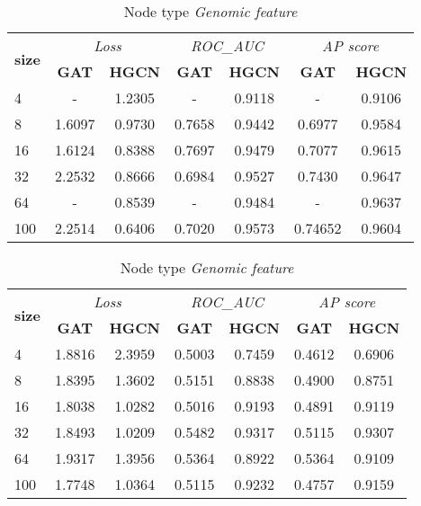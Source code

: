 \begin{table}
    \centering
    \begin{subtable}[t]{\textwidth}
        \centering
        \begin{tabular}{l|cc|cc|cc}        
            \toprule
            \multirow{2}{*}{\textbf{size}} & \multicolumn{2}{c}{\textit{Loss}} & \multicolumn{2}{c}{\textit{ROC\_AUC}} & \multicolumn{2}{c}{\textit{AP score}} \\
            & \textbf{GAT} & \textbf{HGCN} & \textbf{GAT} & \textbf{HGCN} & \textbf{GAT} & \textbf{HGCN} \\
            \midrule
            4 & - & 1.2305 & - & 0.9118 & - & 0.9106 \\
            8 & 1.6097 & 0.9730 & 0.7658 & 0.9442 & 0.6977 & 0.9584 \\
            16 & 1.6124 & 0.8388 & 0.7697 & 0.9479 & 0.7077 & 0.9615 \\
            32 & 2.2532 & 0.8666 & 0.6984 & 0.9527 & 0.7430 & 0.9647 \\
            64 & - & 0.8539 & - & 0.9484 & - & 0.9637 \\
            100 & 2.2514 & 0.6406 & 0.7020 & 0.9573 & 0.74652 & 0.9604 \\
            \bottomrule
        \end{tabular}
        \caption{Node type \textit{Disease}}
    \end{subtable}
    
    \vspace{1em}
    
    \begin{subtable}[t]{\textwidth}
        \centering
        \begin{tabular}{l|cc|cc|cc}        
            \toprule
            \multirow{2}{*}{\textbf{size}} & \multicolumn{2}{c}{\textit{Loss}} & \multicolumn{2}{c}{\textit{ROC\_AUC}} & \multicolumn{2}{c}{\textit{AP score}} \\
            & \textbf{GAT} & \textbf{HGCN} & \textbf{GAT} & \textbf{HGCN} & \textbf{GAT} & \textbf{HGCN} \\
            \midrule
            4 & 1.8816 & 2.3959 & 0.5003 & 0.7459 & 0.4612 & 0.6906 \\
            8 & 1.8395 & 1.3602 & 0.5151 & 0.8838 & 0.4900 & 0.8751 \\
            16 & 1.8038 & 1.0282 & 0.5016 & 0.9193 & 0.4891 & 0.9119 \\
            32 & 1.8493 & 1.0209 & 0.5482 & 0.9317 & 0.5115 & 0.9307 \\
            64 & 1.9317 & 1.3956 & 0.5364 & 0.8922 & 0.5364 & 0.9109 \\
            100 & 1.7748 & 1.0364 & 0.5115 & 0.9232 & 0.4757 & 0.9159 \\
            \bottomrule
        \end{tabular}
        \caption{Node type \textit{Genomic feature}}
        \end{subtable}
    

\end{table}
